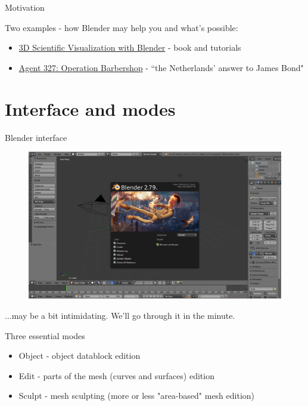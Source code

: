 \documentclass{beamer}
\begin{document}
\begin{frame}{Motivation}

Two examples - how Blender may help you and what's possible:
\begin{itemize}
\item \href{https://www.cv.nrao.edu/~bkent/blender/index.html}{3D Scientific Visualization with Blender} - book and tutorials
\item \href{https://agent327.com/}{Agent 327: Operation Barbershop} - “the Netherlands’ answer to James Bond"
\end{itemize}

\end{frame}

\section{Interface and modes}

\begin{frame}{Blender interface}

\begin{figure}
\includegraphics[scale=0.25]{interface.png}
\end{figure}

...may be a bit intimidating. We'll go through it in the minute.

\end{frame}

\begin{frame}{Three essential modes}

\begin{itemize}
\item Object - object datablock edition
\item Edit - parts of the mesh (curves and surfaces) edition
\item Sculpt - mesh sculpting (more or less "area-based" mesh edition)
\end{itemize}

\end{frame}
\end{document}
